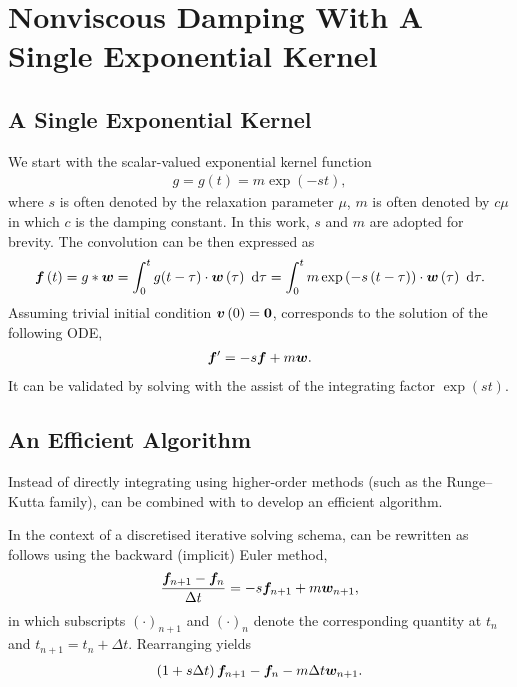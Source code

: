 \section{Nonviscous Damping With A Single Exponential Kernel}
\subsection{A Single Exponential Kernel}
We start with the scalar-valued exponential kernel function
\begin{gather}
g=g\left(t\right)=m\exp\left(-st\right),
\end{gather}
where $s$ is often denoted by the relaxation parameter $\mu$, $m$ is often denoted by $c\mu$ in which $c$ is the damping constant. In this work, $s$ and $m$ are adopted for brevity.
The convolution can be then expressed as
\begin{gather}\label{eq:single_conv}
\bm{f}\left(t\right)=g*\bm{w}=\int_0^tg(t-\tau)\cdot\bm{w}\left(\tau\right)~\mathrm{d}\tau=\int_0^tm\exp\left(-s\left(t-\tau\right)\right)\cdot\bm{w}\left(\tau\right)~\mathrm{d}\tau.
\end{gather}
Assuming trivial initial condition $\bm{v}\left(0\right)=\bm{0}$,  corresponds to the solution of the following ODE,
\begin{gather}\label{eq:single_conv_ode}
\bm{f}'=-s\bm{f}+m\bm{w}.
\end{gather}
It can be validated by solving  with the assist of the integrating factor $\exp\left(st\right)$.
\subsection{An Efficient Algorithm}
Instead of directly integrating  using higher-order methods (such as the Runge--Kutta family),  can be combined with  to develop an efficient algorithm.

In the context of a discretised iterative solving schema,  can be rewritten as follows using the backward (implicit) Euler method,
\begin{gather}\label{eq:discretised_a}
\dfrac{\bm{f}_{n+1}-\bm{f}_n}{\Delta{}t}=-s\bm{f}_{n+1}+m\bm{w}_{n+1},
\end{gather}
in which subscripts $\left(\cdot\right)_{n+1}$ and $\left(\cdot\right)_n$ denote the corresponding quantity at $t_n$ and $t_{n+1}=t_n+\Delta{}t$.
Rearranging  yields
\begin{gather}\label{eq:discretised_b}
\left(1+s\Delta{}t\right)\bm{f}_{n+1}-\bm{f}_n-m\Delta{}t\bm{w}_{n+1}.
\end{gather}

